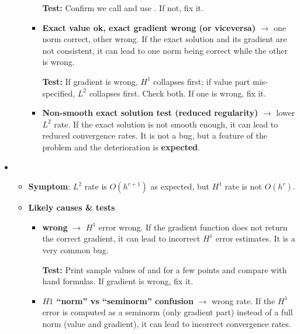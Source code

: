 \begin{itemize}
\begin{itemize}
\begin{itemize}
            \textcolor{Green3}{ \textbf{Test:}} Confirm we call  and use . If not, fix it.


            \item \textbf{Exact value ok, exact gradient wrong (or viceversa)} $\to$ one norm correct, other wrong. If the exact solution and its gradient are not consistent, it can lead to one norm being correct while the other is wrong.

            \textcolor{Green3}{ \textbf{Test:}} If gradient is wrong, $H^1$ collapses first; if value part mis-specified, $L^2$ collapses first. Check both. If one is wrong, fix it.


            \item \textbf{Non-smooth exact solution test (reduced regularity)} $\to$ lower $L^2$ rate. If the exact solution is not smooth enough, it can lead to reduced convergence rates. It is not a bug, but a feature of the problem and the deterioration is \textbf{expected}.
        \end{itemize}
    \end{itemize}

    \item {}
    \begin{itemize}
        \item[\textcolor{Green3}{\faIcon{bug}}] \textbf{Symptom}: $L^2$ rate is $O(h^{r+1})$ as expected, but $H^1$ rate is not $O(h^{r})$.
        \item[\textcolor{Green3}{\faIcon{check}}] \textbf{Likely causes \& tests}
        \begin{itemize}
            \item \textbf{ wrong} $\to$ $H^1$ error wrong. If the gradient function does not return the correct gradient, it can lead to incorrect $H^1$ error estimates. It is a very common bug.

            \textcolor{Green3}{ \textbf{Test:}} Print sample values of  and  for a few points and compare with hand formulas. If gradient is wrong, fix it.


            \item \textbf{$H1$ ``norm'' vs ``seminorm'' confusion} $\to$ wrong rate. If the $H^1$ error is computed as a seminorm (only gradient part) instead of a full norm (value and gradient), it can lead to incorrect convergence rates.


\end{itemize}
\end{itemize}
\end{itemize}

